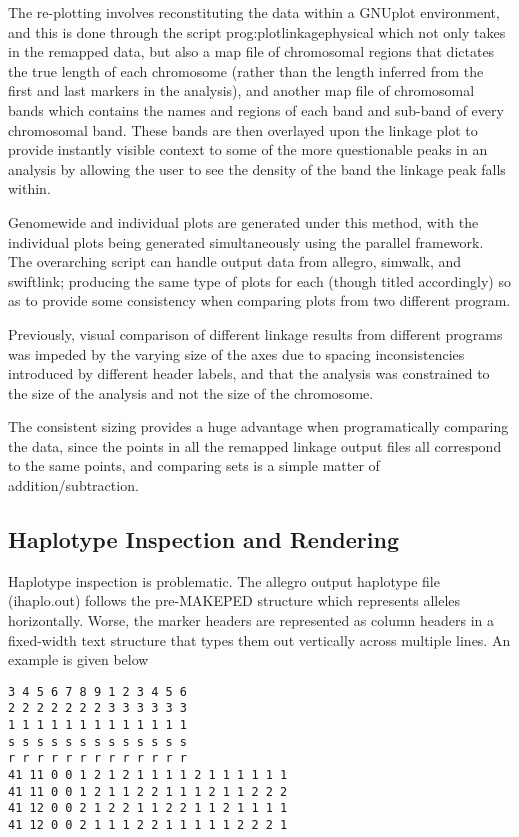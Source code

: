The re-plotting involves reconstituting the data within a GNUplot environment, and this is done through the script \gls{prog:plotlinkagephysical} which not only takes in the remapped data, but also a map file of chromosomal regions that dictates the true length of each chromosome (rather than the length inferred from the first and last markers in the analysis), and another map file of chromosomal bands which contains the names and regions of each band and sub-band of every chromosomal band. These bands are then overlayed upon the linkage plot to provide instantly visible context to some of the more questionable peaks in an analysis by allowing the user to see the density of the band the linkage peak falls within.

Genomewide and individual plots are generated under this method, with the individual plots being generated simultaneously using the parallel framework. The overarching script can handle output data from allegro, simwalk, and swiftlink; producing the same type of plots for each (though titled accordingly) so as to provide some consistency when comparing plots from two different program.

Previously, visual comparison of different linkage results from different programs was impeded by the varying size of the axes due to spacing inconsistencies introduced by different header labels, and that the analysis was constrained to the size of the analysis and not the size of the chromosome.

The consistent sizing provides a huge advantage when programatically comparing the data, since the points in all the remapped linkage output files all correspond to the same points, and comparing sets is a simple matter of addition/subtraction.


\subsection{Haplotype Inspection and Rendering}

Haplotype inspection is problematic. The allegro output haplotype file (ihaplo.out) follows the pre-MAKEPED structure which represents alleles horizontally. Worse, the marker headers are represented as column headers in a fixed-width text structure that types them out vertically across multiple lines. An example is given below

\begingroup
\begin{spacing}{1}
\begin{lstlisting}[label=verb:inhaplo]
3 4 5 6 7 8 9 1 2 3 4 5 6
2 2 2 2 2 2 2 3 3 3 3 3 3
1 1 1 1 1 1 1 1 1 1 1 1 1
s s s s s s s s s s s s s
r r r r r r r r r r r r r
41 11 0 0 1 2 1 2 1 1 1 1 2 1 1 1 1 1 1
41 11 0 0 1 2 1 1 2 2 1 1 1 2 1 1 2 2 2
41 12 0 0 2 1 2 2 1 1 2 2 1 1 2 1 1 1 1
41 12 0 0 2 1 1 1 2 2 1 1 1 1 1 2 2 2 1
\end{lstlisting}
\vspace{-9pt}
\end{spacing}
\endgroup

